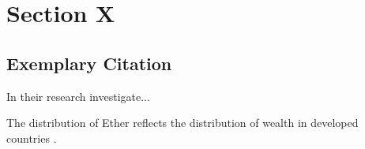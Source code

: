 \clearpage
\section{Section X}
\label{sec:Section_Name_X}

\subsection{Exemplary Citation}
\label{subsec:Section_Name_X/cite}


In their research \textcite{Celig2025} investigate...


The distribution of Ether reflects the distribution of wealth in developed countries \parencite{Celig2025}. \cite{g}